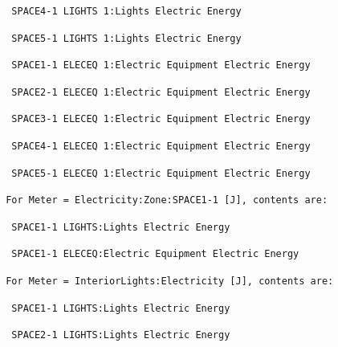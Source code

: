 \begin{lstlisting}
  SPACE4-1 LIGHTS 1:Lights Electric Energy
\end{lstlisting}

\begin{lstlisting}
  SPACE5-1 LIGHTS 1:Lights Electric Energy
\end{lstlisting}

\begin{lstlisting}
  SPACE1-1 ELECEQ 1:Electric Equipment Electric Energy
\end{lstlisting}

\begin{lstlisting}
  SPACE2-1 ELECEQ 1:Electric Equipment Electric Energy
\end{lstlisting}

\begin{lstlisting}
  SPACE3-1 ELECEQ 1:Electric Equipment Electric Energy
\end{lstlisting}

\begin{lstlisting}
  SPACE4-1 ELECEQ 1:Electric Equipment Electric Energy
\end{lstlisting}

\begin{lstlisting}
  SPACE5-1 ELECEQ 1:Electric Equipment Electric Energy
\end{lstlisting}

\begin{lstlisting}
 For Meter = Electricity:Zone:SPACE1-1 [J], contents are:
\end{lstlisting}

\begin{lstlisting}
  SPACE1-1 LIGHTS:Lights Electric Energy
\end{lstlisting}

\begin{lstlisting}
  SPACE1-1 ELECEQ:Electric Equipment Electric Energy
\end{lstlisting}

\begin{lstlisting}
 For Meter = InteriorLights:Electricity [J], contents are:
\end{lstlisting}

\begin{lstlisting}
  SPACE1-1 LIGHTS:Lights Electric Energy
\end{lstlisting}

\begin{lstlisting}
  SPACE2-1 LIGHTS:Lights Electric Energy
\end{lstlisting}

